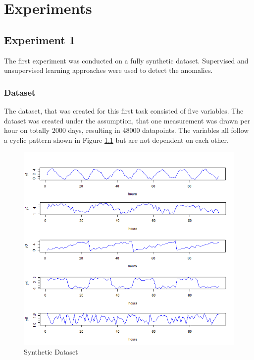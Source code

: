 \chapter{Experiments} \label{Experiments}
 
\section{Experiment 1}
The first experiment was conducted on a fully synthetic dataset. Supervised and unsupervised learning approaches were used to detect the anomalies. 

\subsection{Dataset} \label{dataset1}
The dataset, that was created for this first task consisted of five variables. The dataset was created under the assumption, that one measurement was drawn per hour on totally 2000 days, resulting in 48000 datapoints. The variables all follow a cyclic pattern shown in Figure \ref{fig:synthetic data} but are not dependent on each other. 

\begin{figure}[h]
	\centering
	\includegraphics[scale=0.7]{Figures/synthetic data}
	\decoRule
	\caption[Synthetic Dataset]{Synthetic Dataset \parencite{own}}
	\label{fig:synthetic data}
\end{figure}

